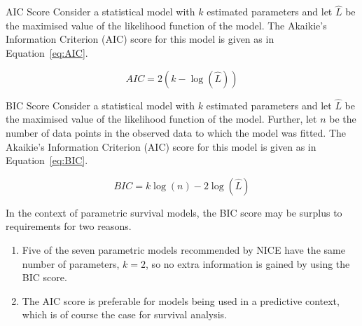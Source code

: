 \begin{definition}[label=def:AIC]{AIC Score}
    Consider a statistical model with $k$ estimated parameters and let $\hat{L}$ be the maximised value of the likelihood function of the model. The Akaikie's Information Criterion (AIC) score for this model is given as in Equation~\ref{eq:AIC}.

    \begin{equation}
        AIC = 2(k - \log(\hat{L}))
        \label{eq:AIC}
    \end{equation}
\end{definition}

\begin{definition}[label=def:BIC]{BIC Score}
    Consider a statistical model with $k$ estimated parameters and let $\hat{L}$ be the maximised value of the likelihood function of the model. Further, let $n$ be the number of data points in the observed data to which the model was fitted. The Akaikie's Information Criterion (AIC) score for this model is given as in Equation~\ref{eq:BIC}.

    \begin{equation}
        BIC =  k\log(n) - 2\log(\hat{L})
        \label{eq:BIC}
    \end{equation}
\end{definition}

In the context of parametric survival models, the BIC score may be surplus to requirements for two reasons.

\begin{enumerate}
    \item Five of the seven parametric models recommended by NICE have the same number of parameters, $k = 2$, so no extra information is gained by using the BIC score. \\
    \item The AIC score is preferable for models being used in a predictive context, which is of course the case for survival analysis.
\end{enumerate}

